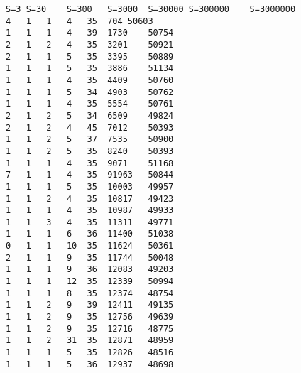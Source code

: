\begin{lstlisting}
S=3	S=30	S=300	S=3000	S=30000	S=300000	S=3000000
4	1	1	4	35	704	50603
1	1	1	4	39	1730	50754
2	1	2	4	35	3201	50921
2	1	1	5	35	3395	50889
1	1	1	5	35	3886	51134
1	1	1	4	35	4409	50760
1	1	1	5	34	4903	50762
1	1	1	4	35	5554	50761
2	1	2	5	34	6509	49824
2	1	2	4	45	7012	50393
1	1	2	5	37	7535	50900
1	1	2	5	35	8240	50393
1	1	1	4	35	9071	51168
7	1	1	4	35	91963	50844
1	1	1	5	35	10003	49957
1	1	2	4	35	10817	49423
1	1	1	4	35	10987	49933
1	1	3	4	35	11311	49771
1	1	1	6	36	11400	51038
0	1	1	10	35	11624	50361
2	1	1	9	35	11744	50048
1	1	1	9	36	12083	49203
1	1	1	12	35	12339	50994
1	1	1	8	35	12374	48754
1	1	2	9	39	12411	49135
1	1	2	9	35	12756	49639
1	1	2	9	35	12716	48775
1	1	2	31	35	12871	48959
1	1	1	5	35	12826	48516
1	1	1	5	36	12937	48698
\end{lstlisting}